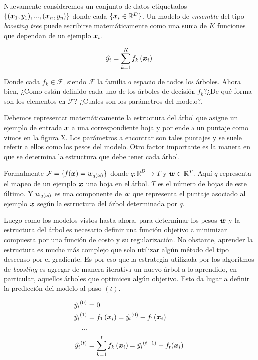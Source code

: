 Nuevamente consideremos un conjunto de datos etiquetados $\{(\boldsymbol{x}_1, y_1),
..., (\boldsymbol{x}_n, y_n)\}$ donde cada $\{\boldsymbol{x}_i \in \mathbb{R}^{D}\}$. Un
modelo de \emph{ensemble} del tipo \emph{boosting tree} puede escribirse
matemáticamente como una suma de $K$ funciones que dependan de un ejemplo
$\boldsymbol{x}_i$.

\begin{equation} \label{eq:xgb-model-1}
    \hat{y_{i}} = \sum_{k=1}^{K} f_{k} \left( \boldsymbol{x}_{i}\right)
\end{equation}

Donde cada $f_k \in \mathcal{F}$, siendo $\mathcal{F}$ la familia o espacio de
todos los árboles. Ahora bien, ¿Como están definido cada uno de los árboles de
decisión $f_k$?¿De qué forma son los elementos en $\mathcal{F}$? ¿Cuales son los
parámetros del modelo?.

Debemos representar matemáticamente la estructura del árbol que asigne un
ejemplo de entrada $\boldsymbol{x}$ a una correspondiente hoja y por ende a un puntaje
como vimos en la figura X. Los parámetros a encontrar son tales puntajes y se
suele referir a ellos como los pesos del modelo. Otro factor importante es la
manera en que se determina la estructura que debe tener cada árbol.

Formalmente $\mathcal{F} = \{f(\boldsymbol{x}) = w_{q\left( \boldsymbol{x} \right)}\}$ donde
$q : \mathbb{R}^{D} \rightarrow T$ y $\boldsymbol{w} \in \mathbb{R}^{T}$. Aquí $q$
representa el mapeo de un ejemplo $\boldsymbol{x}$ una hoja en el árbol. $T$ es el
número de hojas de este último. Y $w_{q\left( \boldsymbol{x} \right)}$ es una
componente de $\boldsymbol{w}$ que representa el puntaje asociado al ejemplo
$\boldsymbol{x}$ según la estructura del árbol determinada por $q$.

Luego como los modelos vistos hasta ahora, para determinar los pesos $\boldsymbol{w}$
y la estructura del árbol es necesario definir una función objetivo a minimizar
compuesta por una función de costo y su regularización. No obstante, aprender la
estructura es mucho más complejo que solo utilizar algún método del tipo
descenso por el gradiente. Es por eso que la estrategia utilizada por los
algoritmos de \emph{boosting} es agregar de manera iterativa un nuevo árbol a lo
aprendido, en particular, aquellos árboles que optimicen algún objetivo. Esto da
lugar a definir la predicción del modelo al paso $(t)$.

\begin{align*}
    \hat{y_i}^{(0)} &= 0 \\
    \hat{y_i}^{(1)} &= f_{1}\left( \boldsymbol{x}_i \right) = \hat{y_i}^{(0)} + f_1{(\boldsymbol{x}_i)} \\
    ... \\
    \hat{y_i}^{(t)} &= \sum_{k=1}^{t} f_{k} \left( \boldsymbol{x}_{i}\right) = \hat{y_i}^{(t - 1)} + f_t{(\boldsymbol{x}_i)}
\end{align*}

